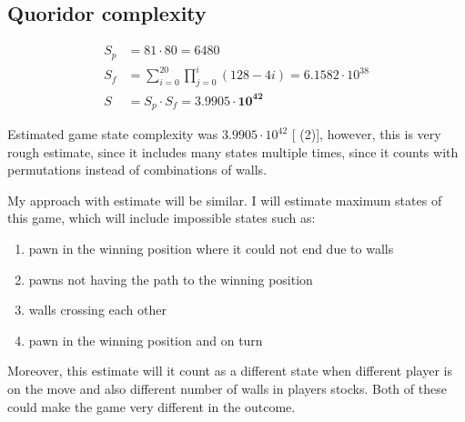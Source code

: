 \documentclass[12pt, oneside]{book}
\begin{document}
  \subsection{Quoridor complexity}
    \begin{figure}
      \vspace*{-1.45cm}
      \begin{equation}
        \label{eqn:mertensestimate}
        \begin{aligned}
          S_p &= 81 \cdot 80 = 6480
          \\
          S_f &= \sum_{i=0}^{20}\prod_{j=0}^{i}(128 - 4i) = 6.1582\cdot10^{38}
          \\
          S &= S_p \cdot S_f = \mathbf{3.9905 \cdot 10 ^{42}}
        \end{aligned}
      \end{equation}
      \vspace*{-1.45cm}
    \end{figure}

    Estimated game state complexity was $3.9905\cdot10^{42}$
    [\cite{mertens} (2)], however, this is very rough estimate, since it
    includes many states multiple times, since it counts with permutations
    instead of combinations of walls.

    My approach with estimate will be similar. I will estimate maximum states
    of this game, which will include impossible states such as:
    \begin{enumerate}[topsep=0pt,itemsep=-1ex,partopsep=1ex,parsep=1ex]
      \setlength\itemsep{0em}
      \item pawn in the winning position where it could not end due to walls
      \item pawns not having the path to the winning position
      \item walls crossing each other
      \item pawn in the winning position and on turn
    \end{enumerate}
    Moreover, this estimate will it count as a different state when different
    player is on the move and also different number of walls in players stocks.
    Both of these could make the game very different in the outcome.
\end{document}
